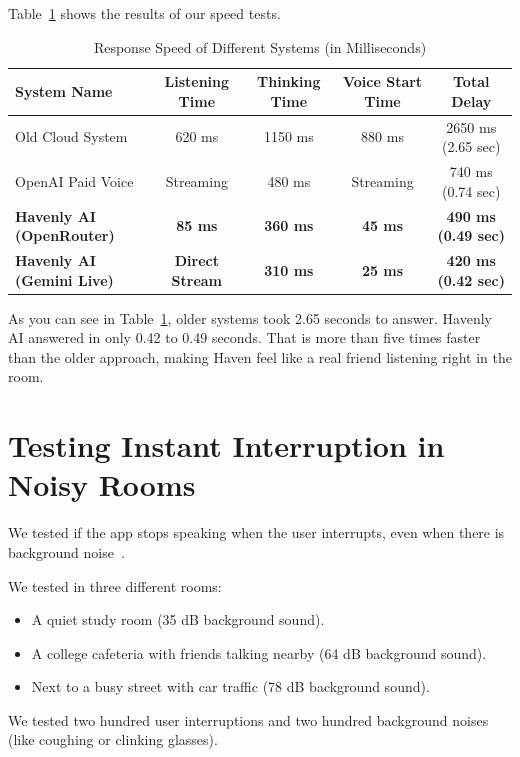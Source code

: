 Table~\ref{tab:latency_benchmarks} shows the results of our speed tests.

\begin{table}[ht]
\centering
\caption{Response Speed of Different Systems (in Milliseconds)}
\label{tab:latency_benchmarks}
\begin{tabularx}{\textwidth}{lcccc}
\toprule
\textbf{System Name} & \textbf{Listening Time} & \textbf{Thinking Time} & \textbf{Voice Start Time} & \textbf{Total Delay} \\
\midrule
Old Cloud System & 620 ms & 1150 ms & 880 ms & 2650 ms (2.65 sec) \\
OpenAI Paid Voice & Streaming & 480 ms & Streaming & 740 ms (0.74 sec) \\
\textbf{Havenly AI (OpenRouter)} & \textbf{85 ms} & \textbf{360 ms} & \textbf{45 ms} & \textbf{490 ms (0.49 sec)} \\
\textbf{Havenly AI (Gemini Live)} & \textbf{Direct Stream} & \textbf{310 ms} & \textbf{25 ms} & \textbf{420 ms (0.42 sec)} \\
\bottomrule
\end{tabularx}
\end{table}

As you can see in Table~\ref{tab:latency_benchmarks}, older systems took 2.65 seconds to answer. Havenly AI answered in only 0.42 to 0.49 seconds. That is more than five times faster than the older approach, making Haven feel like a real friend listening right in the room.

\section{Testing Instant Interruption in Noisy Rooms}
\label{sec:eval_vad}

We tested if the app stops speaking when the user interrupts, even when there is background noise~\cite{johnston2018vad}. 

We tested in three different rooms:
\begin{itemize}
    \item A quiet study room (35 dB background sound).
    \item A college cafeteria with friends talking nearby (64 dB background sound).
    \item Next to a busy street with car traffic (78 dB background sound).
\end{itemize}

We tested two hundred user interruptions and two hundred background noises (like coughing or clinking glasses).

